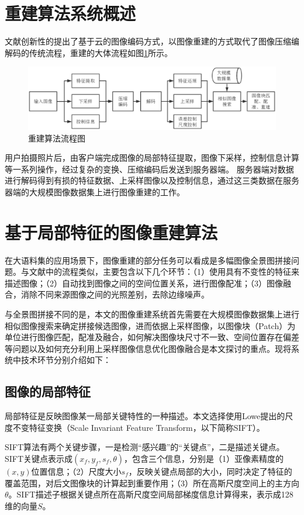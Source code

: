 \documentclass[UTF8]{csoarticle}
\begin{document}
\section{重建算法系统概述}
文献\cite{Cloud}创新性的提出了基于云的图像编码方式，以图像重建的方式取代了图像压缩编解码的传统流程，重建的大体流程如图\ref{fig:flow}所示。
\begin{figure}
\centering\includegraphics[width=15cm]{flowchart}
\caption{重建算法流程图}
\label{fig:flow}
\end{figure}
用户拍摄照片后，由客户端完成图像的局部特征提取，图像下采样，控制信息计算等一系列操作，经过复杂的变换、压缩编码后发送到服务器端。
服务器端对数据进行解码得到有损的特征数据、上采样图像以及控制信息，通过这三类数据在服务器端的大规模图像数据集上进行图像重建的工作。

\section{基于局部特征的图像重建算法}
在大语料集的应用场景下，图像重建的部分任务可以看成是多幅图像全景图拼接问题。与文献\cite{Brown:2006ir}中的流程类似，主要包含以下几个环节：（1）使用具有不变性的特征来描述图像；（2）自动找到图像之间的空间位置关系，进行图像配准；（3）图像融合，消除不同来源图像之间的光照差别，去除边缘噪声。

与全景图拼接不同的是，本文的图像重建系统首先需要在大规模图像数据集上进行相似图像搜索来确定拼接候选图像，进而依据上采样图像，以图像块（Patch）为单位进行图像匹配，配准及融合，如何解决图像块尺寸不一致、空间位置存在偏差等问题以及如何充分利用上采样图像信息优化图像融合是本文探讨的重点。现将系统中技术环节分别介绍如下：

\subsection{图像的局部特征}
局部特征是反映图像某一局部关键特性的一种描述。本文选择使用Lowe提出的尺度不变特征变换（Scale Invariant Feature Transform，以下简称SIFT）。

SIFT算法有两个关键步骤，一是检测“感兴趣”的“关键点”，二是描述关键点。SIFT关键点表示成\((x_f,y_f,s_f,\theta)\)，包含三个信息，分别是（1）亚像素精度的\((x,y)\)位置信息；（2）尺度大小\(s_f\)，反映关键点局部的大小，同时决定了特征的覆盖范围，对后文图像块的计算起到重要作用；（3）所在高斯尺度空间上的主方向\(\theta\)。SIFT描述子根据关键点所在高斯尺度空间局部梯度信息计算得来，表示成128维的向量\(S\)。
\end{document}
